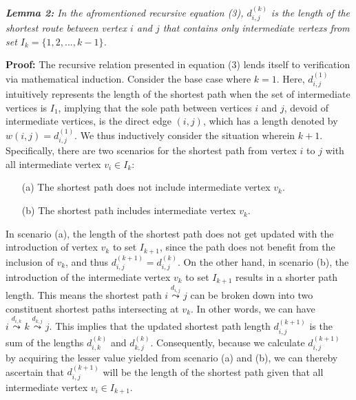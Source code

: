 \documentclass[12pt]{article}
\begin{document}
\hspace*{\fill} %

\textit{\textbf{Lemma 2:} In the afromentioned recursive equation (3), $d^{(k)}_{i,j}$ is the length of the shortest route between vertex $i$ and $j$ that contains only intermediate vertexs from set $I_k = \{1,2,...,k-1\}$.}

\hspace*{\fill} %

\textbf{Proof:} 
The recursive relation presented in equation (3) lends itself to verification via mathematical induction. Consider the base case where $k = 1$. Here, $d^{(1)}_{i,j}$ intuitively represents the length of the shortest path when the set of intermediate vertices is $ I_1 $, implying that the sole path between vertices $ i $ and $j$, devoid of intermediate vertices, is the direct edge $ (i, j) $, which has a length denoted by $ w(i, j) = d^{(1)}_{i,j} $. We thus inductively consider the situation wherein $k+1$. Specifically, there are two scenarios for the shortest path from vertex $i$ to $j$ with all intermediate vertex $v_i \in I_k$:

\begin{enumerate} %
    \item[(a)] The shortest path does not include intermediate vertex $v_k$.
    \item[(b)] The shortest path includes intermediate vertex $v_k$.
    \end{enumerate}

In scenario (a), the length of the shortest path does not get updated with the introduction of vertex $v_k$ to set $I_{k+1}$, since the path does not benefit from the inclusion of $v_k$, and thus $d^{(k+1)}_{i,j} = d^{(k)}_{i,j}$. On the other hand, in scenario (b), the introduction of the intermediate vertex $v_k$ to set $I_{k+1}$ results in a shorter path length. This means the shortest path $i \overset{d_{i,j}}{\operatorname*{\leadsto}} j$ can be broken down into two constituent shortest paths intersecting at $v_k$. In other words, we can have $i \overset{d_{i,k}}{\operatorname*{\leadsto}} k \overset{d_{k,j}}{\operatorname*{\leadsto}} j$. This implies that the updated shortest path length $d^{(k+1)}_{i,j}$ is the sum of the lengths $d^{(k)}_{i,k}$ and $d^{(k)}_{k,j}$. Consequently, because we calculate $d^{(k+1)}_{i,j}$ by acquiring the lesser value yielded from scenario (a) and (b), we can thereby ascertain that $d^{(k+1)}_{i,j}$ will be the length of the shortest path given that all intermediate vertex $v_i \in I_{k+1}$.
\end{document}

